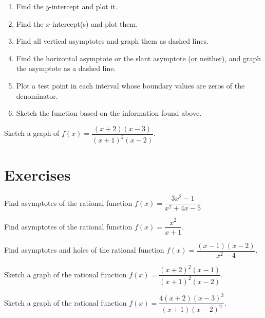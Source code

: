 \begin{howto}
  \begin{enumerate}
  \item Find the $y$-intercept and plot it.
  \item Find the $x$-intercept(s) and plot them.
  \item Find all vertical asymptotes and graph them as dashed lines.
  \item Find the horizontal asymptote or the slant asymptote (or neither), and graph the asymptote as a dashed line.
  \item Plot a test point in each interval whose boundary values are zeros of the denominator.
  \item Sketch the function based on the information found above.
  \end{enumerate}
\end{howto}

\begin{example}
  Sketch a graph of  $f(x)=\dfrac{(x+2)(x-3)}{(x+1)^2(x-2)}$.
\end{example}

\newpage

\section*{Exercises}

\begin{example}
  Find asymptotes of the rational function $f(x)=\dfrac{3x^2-1}{x^2+4x-5}$
\end{example}

\begin{exercise}
  Find asymptotes of the rational function $f(x)=\dfrac{x^{2}}{x + 1}$.
\end{exercise}

\begin{exercise}
  Find asymptotes and holes of the rational function $f(x)=\dfrac{(x-1)(x-2)}{x^2-4}$.
\end{exercise}
\newpage

\begin{exercise}
  Sketch a graph of the rational function $f(x)=\dfrac{(x+2)^2(x-1)}{(x+1)^2(x-2)}$.
\end{exercise}

\begin{exercise}
  Sketch a graph of the rational function  $f(x)=\dfrac{4(x+2)(x-3)^3}{(x+1)(x-2)^2}$.
\end{exercise}

